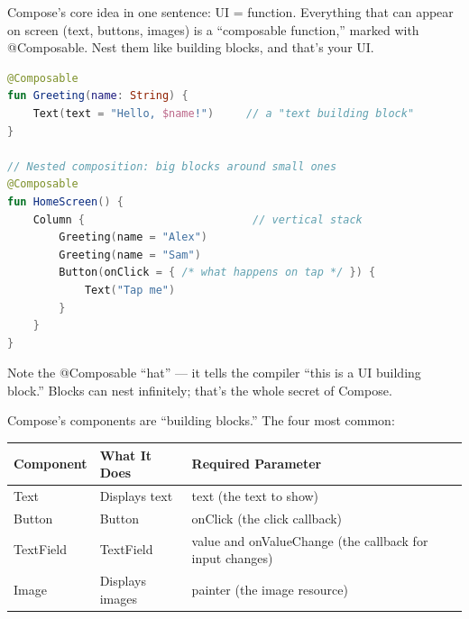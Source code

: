 


Compose's core idea in one sentence: UI = function. Everything that can appear on screen (text, buttons, images) is a “composable function,” marked with @Composable. Nest them like building blocks, and that's your UI.

\begin{lstlisting}[language=Kotlin]
@Composable
fun Greeting(name: String) {
    Text(text = "Hello, $name!")     // a "text building block"
}

// Nested composition: big blocks around small ones
@Composable
fun HomeScreen() {
    Column {                          // vertical stack
        Greeting(name = "Alex")
        Greeting(name = "Sam")
        Button(onClick = { /* what happens on tap */ }) {
            Text("Tap me")
        }
    }
}
\end{lstlisting}

Note the @Composable “hat” — it tells the compiler “this is a UI building block.” Blocks can nest infinitely; that's the whole secret of Compose.


Compose's components are “building blocks.” The four most common:

\begin{center}
\begin{tabularx}{\linewidth}{|X|X|X|}
\hline
\textbf{Component} & \textbf{What It Does} & \textbf{Required Parameter} \tabularnewline
\hline
Text & Displays text & text (the text to show) \tabularnewline
Button & Button & onClick (the click callback) \tabularnewline
TextField & TextField & value and onValueChange (the callback for input changes) \tabularnewline
Image & Displays images & painter (the image resource) \tabularnewline
\hline
\end{tabularx}
\end{center}


